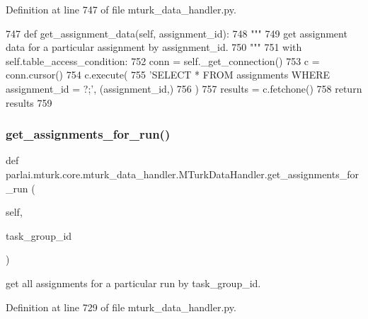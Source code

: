 Definition at line 747 of file mturk\+\_\+data\+\_\+handler.\+py.


\begin{DoxyCode}
747     \textcolor{keyword}{def }get\_assignment\_data(self, assignment\_id):
748         \textcolor{stringliteral}{"""}
749 \textcolor{stringliteral}{        get assignment data for a particular assignment by assignment\_id.}
750 \textcolor{stringliteral}{        """}
751         with self.table\_access\_condition:
752             conn = self.\_get\_connection()
753             c = conn.cursor()
754             c.execute(
755                 \textcolor{stringliteral}{'SELECT * FROM assignments WHERE assignment\_id = ?;'}, (assignment\_id,)
756             )
757             results = c.fetchone()
758             \textcolor{keywordflow}{return} results
759 
\end{DoxyCode}
\mbox{\label{classparlai_1_1mturk_1_1core_1_1mturk__data__handler_1_1MTurkDataHandler_ad08412db3d132299e287f182fef8b6dc}} 
\subsubsection{\texorpdfstring{get\+\_\+assignments\+\_\+for\+\_\+run()}{get\_assignments\_for\_run()}}
{\footnotesize\ttfamily def parlai.\+mturk.\+core.\+mturk\+\_\+data\+\_\+handler.\+M\+Turk\+Data\+Handler.\+get\+\_\+assignments\+\_\+for\+\_\+run (\begin{DoxyParamCaption}\item[{}]{self,  }\item[{}]{task\+\_\+group\+\_\+id }\end{DoxyParamCaption})}

\begin{DoxyVerb}get all assignments for a particular run by task_group_id.
\end{DoxyVerb}
 

Definition at line 729 of file mturk\+\_\+data\+\_\+handler.\+py.


